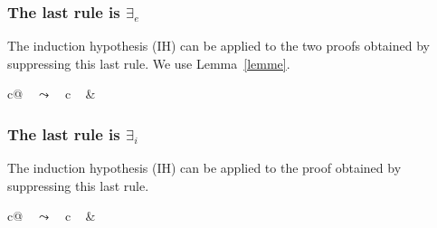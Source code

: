 \documentclass[english]{smfart}
\theoremstyle{plain}
\begin{document}
\subsubsection{The last rule is  $\exists_e$}

The induction hypothesis (IH) can be applied to the two proofs 
obtained by suppressing this last rule. 
We use Lemma~\ref{lemme}. 

\begin{center}
\begin{tabular}{c@{$\quad\leadsto\quad$}c}
\mbox{
} &
\mbox{
}
\end{tabular}
\end{center}

\subsubsection{The last rule is $\exists_i$}

The induction hypothesis (IH) can be applied to the proof 
obtained by suppressing this last rule. 

\begin{center}
\begin{tabular}{c@{$\quad\leadsto\quad$}c}
\mbox{
} &
\mbox{
} \\
\end{tabular}
\end{center}

\backmatter 


 
\end{document}
